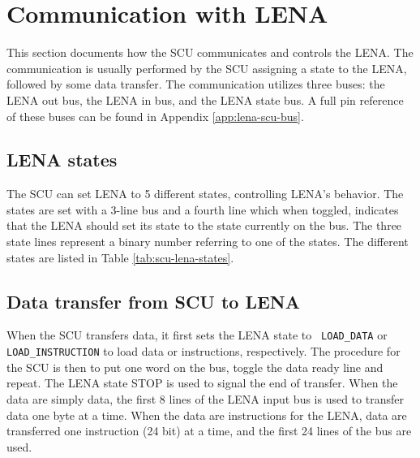 \section{Communication with LENA}
\label{sec:SCU-LENA-communication}

This section documents how the \ac{SCU} communicates and controls the
\ac{LENA}. The communication is usually performed by the \ac{SCU} assigning a
state to the \ac{LENA}, followed by some data transfer. The communication utilizes three buses: 
the LENA out bus, the LENA in bus, and the LENA state bus. A full pin reference of these buses can
be found in Appendix \ref{app:lena-scu-bus}.

\subsection{LENA states}

The \ac{SCU} can set \ac{LENA} to 5 different states, controlling \ac{LENA}'s
behavior. The states are set with a 3-line bus and a fourth line which when
toggled, indicates that the \ac{LENA} should set its state to the state
currently on the bus. The three state lines represent a binary number referring
to one of the states. The different states are listed in Table \ref{tab:scu-lena-states}.



\subsection{Data transfer from SCU to LENA}
When the \ac{SCU} transfers data, it first sets the \ac{LENA} state to {\tt
  LOAD\_DATA} or {\tt LOAD\_INSTRUCTION} to load data or instructions,
respectively. The procedure for the \ac{SCU} is then to put one word on the bus,
toggle the data ready line and repeat. The \ac{LENA} state STOP is used to signal the
end of transfer. When the data are simply data, the first 8 lines of
the \ac{LENA} input bus is used to transfer data one byte at a time. When the
data are instructions for the \ac{LENA}, data are transferred one instruction (24
bit) at a time, and the first 24 lines of the bus are used.


